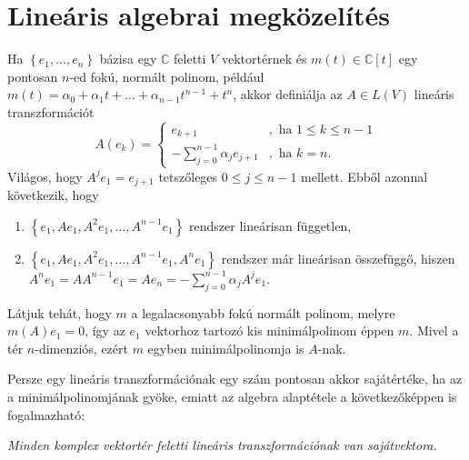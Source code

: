 \documentclass[9pt, a4paper, showtrims]{memoir}
\theoremstyle{plain}
\theoremstyle{remark}
\theoremstyle{definition}
\begin{document}
\section{Lineáris algebrai megközelítés}
Ha $\left\{ e_1,\dots,e_n \right\}$ bázisa egy $\mathbb{C}$ feletti $V$ vektortérnek
és $m\left( t \right)\in\mathbb{C}\left[ t \right]$ egy pontosan $n$-ed fokú, 
normált polinom,
például
$m\left( t \right)=\alpha_0+\alpha_1 t+\dots+\alpha_{n-1}t^{n-1}+t^{n}$,
akkor definiálja az $A\in L\left( V \right)$ lineáris transzformációt
\[
    A\left( e_k \right)=
    \begin{cases}
        e_{k+1}&, \text{ ha } 1\leq k \leq n-1\\
        -\sum_{j=0}^{n-1}\alpha_j e_{j+1}&, \text{ ha } k=n.
    \end{cases}
\]
Világos, hogy $A^je_1=e_{j+1}$ tetszőleges $0\leq j\leq n-1$ mellett.
Ebből azonnal következik, hogy 
\begin{enumerate}
    \item 
        $\left\{ e_1, Ae_1,A^2e_1,\dots,A^{n-1}e_1\right\}$ rendszer lineárisan független,
    \item
        $\left\{ e_1, Ae_1,A^2e_1,\dots,A^{n-1}e_1,A^ne_1\right\}$ rendszer már lineárisan összefüggő,
        hiszen
        $A^ne_1=AA^{n-1}e_1=Ae_n=-\sum_{j=0}^{n-1}\alpha_j A^je_1$.
\end{enumerate}
Látjuk tehát, hogy $m$ a legalacsonyabb fokú normált polinom, melyre
$m\left( A \right)e_1=0$,
így az $e_1$ vektorhoz tartozó kis minimálpolinom éppen $m$.
Mivel a tér $n$-dimenziós, ezért $m$ egyben minimálpolinomja is $A$-nak.

Persze egy lineáris transzformációnak egy szám pontosan akkor sajátértéke,
ha az a minimálpolinomjának gyöke,
emiatt 
az algebra alaptétele a következőképpen is fogalmazható:
\begin{center}
    \emph{Minden komplex vektortér feletti lineáris transzformációnak van sajátvektora.}
\end{center}
\end{document}
